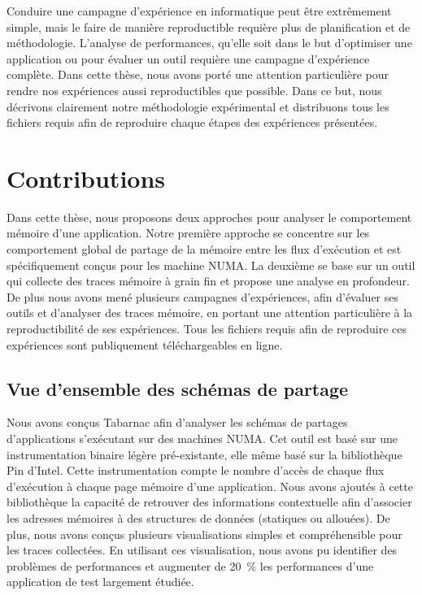 Conduire une campagne d'expérience en informatique peut être extrêmement simple, mais le faire de manière reproductible requière plus de planification et de méthodologie.
L'analyse de performances, qu'elle soit dans le but d'optimiser une application ou pour évaluer un outil requière une campagne d'expérience complète.
Dans cette thèse, nous avons porté une attention particulière pour rendre nos expériences aussi reproductibles que possible.
Dans ce but, nous décrivons clairement notre méthodologie expérimental et distribuons tous les fichiers requis afin de reproduire chaque étapes des expériences présentées.

\section*{Contributions}

Dans cette thèse, nous proposons deux approches pour analyser le comportement mémoire d'une application.
Notre première approche se concentre sur les comportement global de partage de la mémoire entre les flux d'exécution et est spécifiquement conçus pour les machine NUMA.
La deuxième se base sur un outil qui collecte des traces mémoire à grain fin et propose une analyse en profondeur.
De plus nous avons mené plusieurs campagnes d'expériences, afin d'évaluer ses outils et d'analyser des traces mémoire, en portant une attention particulière à la reproductibilité de ses expériences.
Tous les fichiers requis afin de reproduire ces expériences sont publiquement téléchargeables en ligne.

\subsection*{Vue d'ensemble des schémas de partage}

Nous avons conçus \gls{Tabarnac} afin d'analyser les schémas de partages d'applications s'exécutant sur des machines NUMA.
Cet outil est basé sur une instrumentation binaire légère pré-existante, elle même basé sur la bibliothèque \gls{Pin} d'\gls{Intel}.
Cette instrumentation compte le nombre d'accès de chaque flux d'exécution à chaque page mémoire d'une application.
Nous avons ajoutés à cette bibliothèque la capacité de retrouver des informations contextuelle afin d'associer les adresses mémoires à des structures de données (statiques ou allouées).
De plus, nous avons conçus plusieurs visualisations simples et compréhensible pour les traces collectées.
En utilisant ces visualisation, nous avons pu identifier des problèmes de performances et augmenter de \SI{20}{\%} les performances d'une application de test largement étudiée.

